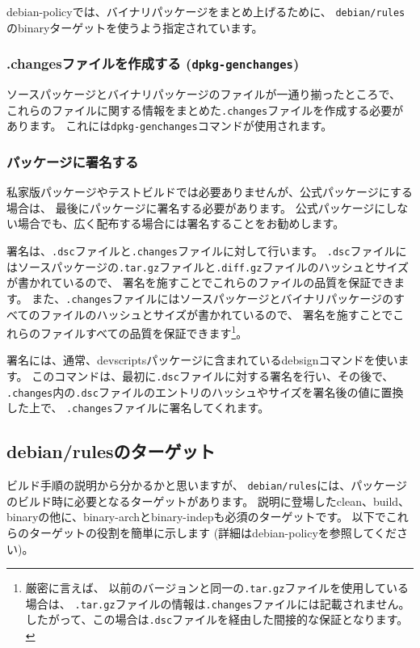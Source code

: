 \documentclass[mingoth,a4paper]{jsarticle}
\begin{document}
debian-policyでは、バイナリパッケージをまとめ上げるために、
\texttt{debian/rules}のbinaryターゲットを使うよう指定されています。

\subsubsection{.changesファイルを作成する (\texttt{dpkg-genchanges})}

ソースパッケージとバイナリパッケージのファイルが一通り揃ったところで、
これらのファイルに関する情報をまとめた\texttt{.changes}ファイルを作成する必要があります。
これには\texttt{dpkg-genchanges}コマンドが使用されます。

\subsubsection{パッケージに署名する}

私家版パッケージやテストビルドでは必要ありませんが、公式パッケージにする場合は、
最後にパッケージに署名する必要があります。
公式パッケージにしない場合でも、広く配布する場合には署名することをお勧めします。

署名は、\texttt{.dsc}ファイルと\texttt{.changes}ファイルに対して行います。
\texttt{.dsc}ファイルにはソースパッケージの\texttt{.tar.gz}ファイルと\texttt{.diff.gz}ファイルのハッシュとサイズが書かれているので、
署名を施すことでこれらのファイルの品質を保証できます。
また、\texttt{.changes}ファイルにはソースパッケージとバイナリパッケージのすべてのファイルのハッシュとサイズが書かれているので、
署名を施すことでこれらのファイルすべての品質を保証できます\footnote{厳密に言えば、
以前のバージョンと同一の\texttt{.tar.gz}ファイルを使用している場合は、
\texttt{.tar.gz}ファイルの情報は\texttt{.changes}ファイルには記載されません。
したがって、この場合は\texttt{.dsc}ファイルを経由した間接的な保証となります。}。

署名には、通常、devscriptsパッケージに含まれているdebsignコマンドを使います。
このコマンドは、最初に\texttt{.dsc}ファイルに対する署名を行い、その後で、
\texttt{.changes}内の\texttt{.dsc}ファイルのエントリのハッシュやサイズを署名後の値に置換した上で、
\texttt{.changes}ファイルに署名してくれます。

\subsection{debian/rulesのターゲット}

ビルド手順の説明から分かるかと思いますが、
\texttt{debian/rules}には、パッケージのビルド時に必要となるターゲットがあります。
説明に登場したclean、build、binaryの他に、binary-archとbinary-indepも必須のターゲットです。
以下でこれらのターゲットの役割を簡単に示します (詳細はdebian-policyを参照してください)。
\end{document}
